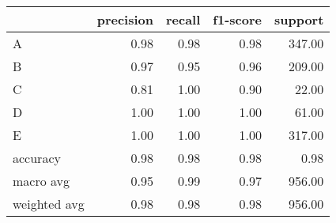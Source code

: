 \begin{tabular}{|l|r|r|r|r|}
\hline
{} &  precision &  recall &  f1-score &  support \\
\hline
A            &       0.98 &    0.98 &      0.98 &   347.00 \\
B            &       0.97 &    0.95 &      0.96 &   209.00 \\
C            &       0.81 &    1.00 &      0.90 &    22.00 \\
D            &       1.00 &    1.00 &      1.00 &    61.00 \\
E            &       1.00 &    1.00 &      1.00 &   317.00 \\
accuracy     &       0.98 &    0.98 &      0.98 &     0.98 \\
macro avg    &       0.95 &    0.99 &      0.97 &   956.00 \\
weighted avg &       0.98 &    0.98 &      0.98 &   956.00 \\
\hline
\end{tabular}

